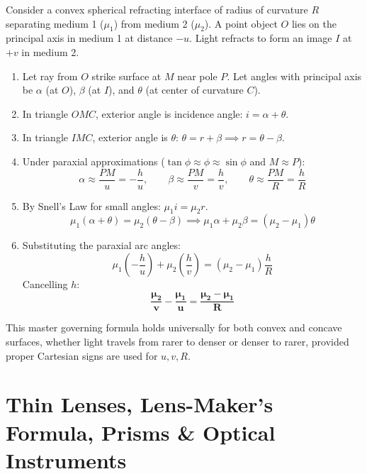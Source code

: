 \documentclass[10pt,twoside,openright]{book}
\begin{document}
\begin{formulabox}
Consider a convex spherical refracting interface of radius of curvature $R$ separating medium 1 ($\mu_1$) from medium 2 ($\mu_2$). A point object $O$ lies on the principal axis in medium 1 at distance $-u$. Light refracts to form an image $I$ at $+v$ in medium 2.
\begin{enumerate}
  \item Let ray from $O$ strike surface at $M$ near pole $P$. Let angles with principal axis be $\alpha$ (at $O$), $\beta$ (at $I$), and $\theta$ (at center of curvature $C$).
  \item In triangle $OMC$, exterior angle is incidence angle: $i = \alpha + \theta$.
  \item In triangle $IMC$, exterior angle is $\theta$: $\theta = r + \beta \implies r = \theta - \beta$.
  \item Under paraxial approximations ($\tan\phi \approx \phi \approx \sin\phi$ and $M \approx P$):
  \begin{equation}
    \alpha \approx \frac{PM}{u} = -\frac{h}{u}, \qquad \beta \approx \frac{PM}{v} = \frac{h}{v}, \qquad \theta \approx \frac{PM}{R} = \frac{h}{R}
  \end{equation}
  \item By Snell's Law for small angles: $\mu_1 i = \mu_2 r$.
  \begin{equation}
    \mu_1 (\alpha + \theta) = \mu_2 (\theta - \beta) \implies \mu_1 \alpha + \mu_2 \beta = (\mu_2 - \mu_1)\theta
  \end{equation}
  \item Substituting the paraxial arc angles:
  \begin{equation}
    \mu_1 \left(-\frac{h}{u}\right) + \mu_2 \left(\frac{h}{v}\right) = (\mu_2 - \mu_1)\frac{h}{R}
  \end{equation}
  Cancelling $h$:
  \begin{equation}
    \mathbf{\frac{\mu_2}{v} - \frac{\mu_1}{u} = \frac{\mu_2 - \mu_1}{R}}
  \end{equation}
\end{enumerate}
This master governing formula holds universally for both convex and concave surfaces, whether light travels from rarer to denser or denser to rarer, provided proper Cartesian signs are used for $u, v, R$.
\end{formulabox}

\section{Thin Lenses, Lens-Maker's Formula, Prisms \& Optical Instruments}
\end{document}
